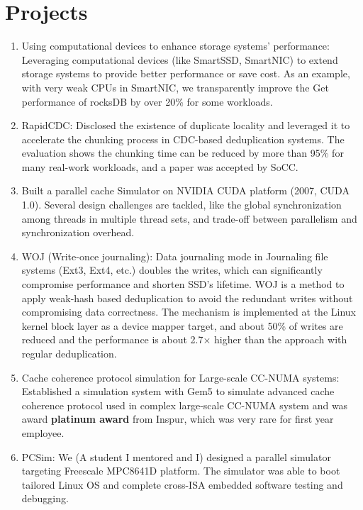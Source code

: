 \documentclass{article}
\begin{document}
\section{Projects}
\small
\begin{enumerate}
\item Using computational devices to enhance storage systems' performance: Leveraging computational devices (like SmartSSD, SmartNIC) to extend storage systems to provide better performance or save cost. As an example, with very weak CPUs in SmartNIC, we transparently improve the Get performance of rocksDB by over 20\% for some workloads.
\item	RapidCDC:  Disclosed the existence of duplicate locality and leveraged it to accelerate the chunking process in CDC-based deduplication systems. The evaluation shows the chunking time can be reduced by more than 95\% for many real-work workloads, and a paper was accepted by SoCC.
\item	Built a parallel cache Simulator on NVIDIA CUDA platform (2007, CUDA 1.0). Several design challenges are tackled, like the global synchronization among threads in multiple thread sets, and trade-off between parallelism and synchronization overhead.
\item  WOJ (Write-once journaling): Data journaling mode in Journaling file systems (Ext3, Ext4, etc.) doubles the writes, which can significantly compromise performance and shorten SSD's lifetime. WOJ is a method to apply weak-hash based deduplication to avoid the redundant writes without compromising data correctness. The mechanism is implemented at the Linux kernel block layer as a device mapper target, and about 50\% of writes are reduced and the performance is about 2.7$\times$ higher than the approach with regular deduplication. 
\item	Cache coherence protocol simulation for Large-scale CC-NUMA systems: Established a simulation system with Gem5 to simulate advanced cache coherence protocol used in complex large-scale CC-NUMA system and was award \textbf{platinum award} from Inspur, which was very rare for first year employee.
\item	PCSim: We (A student I mentored and I) designed a parallel simulator targeting Freescale MPC8641D platform. The simulator was able to boot tailored Linux OS and complete cross-ISA embedded software testing and debugging.
\end{enumerate}
\end{document}
